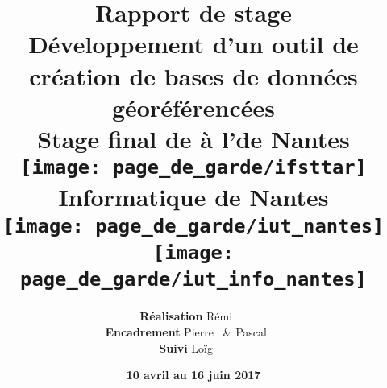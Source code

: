 \title{
  \Huge \textbf{Rapport de stage}
  \bigskip
  \\
  \large\textbf{
    Développement d'un outil de création de bases de données géoréférencées
  }
  \smallskip
  \\
  \normalsize\textbf{
    Stage final de \dut à l'\ifsttar de Nantes
  }
  \bbb
  \\
  \texttt{[image: page\_de\_garde/ifsttar]}
  \bigskip\bigskig\bigskip
  \\
  \Large \textbf{\iut Informatique de Nantes}
  \bigskip
  \\
  \texttt{[image: page\_de\_garde/iut\_nantes]}
  \qquad\qquad\qquad
  \texttt{[image: page\_de\_garde/iut\_info\_nantes]}
  \bigskip
}
\author{
  \textbf{Réalisation} \hfill Rémi~ \hfill\qquad\qquad\qquad\qquad~
  \\
  \textbf{Encadrement} \qquad\hfill Pierre~ \& Pascal~ \hfill~
  \\
  \textbf{Suivi} \hfill Loïg~ \hfill\qquad\qquad~
  \bigskip
}
\date{\textbf{10 avril au 16 juin 2017}}
